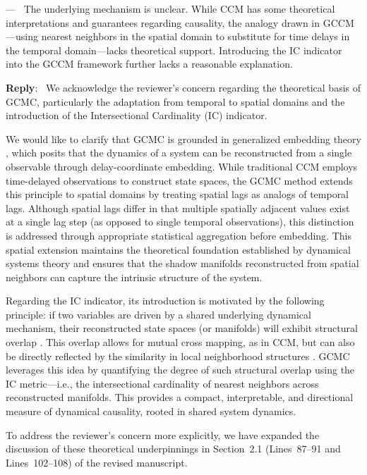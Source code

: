 \documentclass[11pt]{article}
\newcounter{reviewer}
\newcounter{point}[reviewer]
\renewcommand{\thepoint}{Comment\,\thereviewer.\arabic{point}}
\newenvironment{point}
   {\refstepcounter{point} \bigskip \noindent {\textbf{Reviewer~\thepoint} } ---\ }
   {\par }
\newenvironment{reply}
   {\medskip \noindent \color{blue} \begin{sf}\textbf{Reply}:\  }
   {\medskip \par \end{sf}}
\begin{document}
\begin{point}
The underlying mechanism is unclear. While CCM has some theoretical interpretations and guarantees regarding causality, the analogy drawn in GCCM—using nearest neighbors in the spatial domain to substitute for time delays in the temporal domain—lacks theoretical support. Introducing the IC indicator into the GCCM framework further lacks a reasonable explanation.
\end{point}
\begin{reply}
We acknowledge the reviewer’s concern regarding the theoretical basis of GCMC, particularly the adaptation from temporal to spatial domains and the introduction of the Intersectional Cardinality (IC) indicator. 

We would like to clarify that GCMC is grounded in generalized embedding theory \citep{Takens1981embedding,Mane1981embedding}, which posits that the dynamics of a system can be reconstructed from a single observable through delay-coordinate embedding. While traditional CCM employs time-delayed observations to construct state spaces, the GCMC method extends this principle to spatial domains by treating spatial lags as analogs of temporal lags. Although spatial lags differ in that multiple spatially adjacent values exist at a single lag step (as opposed to single temporal observations), this distinction is addressed through appropriate statistical aggregation before embedding. This spatial extension maintains the theoretical foundation established by dynamical systems theory and ensures that the shadow manifolds reconstructed from spatial neighbors can capture the intrinsic structure of the system.

Regarding the IC indicator, its introduction is motivated by the following principle: if two variables are driven by a shared underlying dynamical mechanism, their reconstructed state spaces (or manifolds) will exhibit structural overlap \citep{sugihara2012ccm,gao2023gccm}. This overlap allows for mutual cross mapping, as in CCM, but can also be directly reflected by the similarity in local neighborhood structures \citep{tao2023cmc}. GCMC leverages this idea by quantifying the degree of such structural overlap using the IC metric—i.e., the intersectional cardinality of nearest neighbors across reconstructed manifolds. This provides a compact, interpretable, and directional measure of dynamical causality, rooted in shared system dynamics.

To address the reviewer’s concern more explicitly, we have expanded the discussion of these theoretical underpinnings in Section~2.1 (Lines~87--91 and Lines~102--108) of the revised manuscript.
\end{reply}
\end{document}
